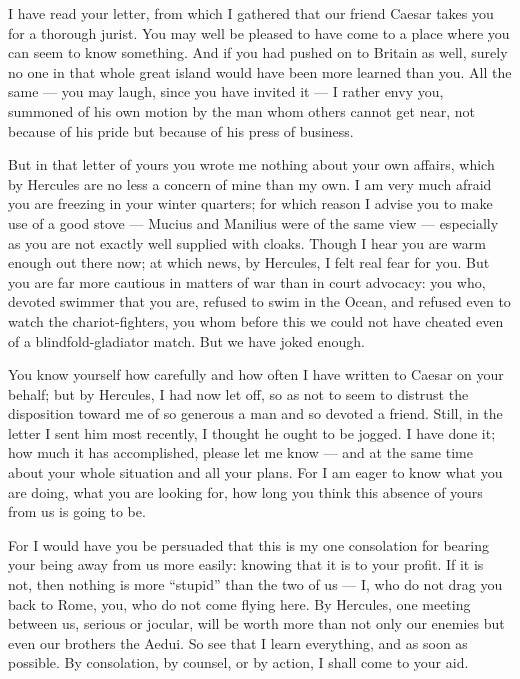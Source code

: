 

 I have read your letter, from which I gathered that our friend Caesar takes you for a thorough jurist. You may well be pleased to have come to a place where you can seem to know something. And if you had pushed on to Britain as well, surely no one in that whole great island would have been more learned than you. All the same --- you may laugh, since you have invited it --- I rather envy you, summoned of his own motion by the man whom others cannot get near, not because of his pride but because of his press of business.

 But in that letter of yours you wrote me nothing about your own affairs, which by Hercules are no less a concern of mine than my own. I am very much afraid you are freezing in your winter quarters; for which reason I advise you to make use of a good stove --- Mucius and Manilius were of the same view --- especially as you are not exactly well supplied with cloaks. Though I hear you are warm enough out there now; at which news, by Hercules, I felt real fear for you. But you are far more cautious in matters of war than in court advocacy: you who, devoted swimmer that you are, refused to swim in the Ocean, and refused even to watch the chariot-fighters, you whom before this we could not have cheated even of a blindfold-gladiator match. But we have joked enough.

 You know yourself how carefully and how often I have written to Caesar on your behalf; but by Hercules, I had now let off, so as not to seem to distrust the disposition toward me of so generous a man and so devoted a friend. Still, in the letter I sent him most recently, I thought he ought to be jogged. I have done it; how much it has accomplished, please let me know --- and at the same time about your whole situation and all your plans. For I am eager to know what you are doing, what you are looking for, how long you think this absence of yours from us is going to be.

 For I would have you be persuaded that this is my one consolation for bearing your being away from us more easily: knowing that it is to your profit. If it is not, then nothing is more ``stupid'' than the two of us --- I, who do not drag you back to Rome, you, who do not come flying here. By Hercules, one meeting between us, serious or jocular, will be worth more than not only our enemies but even our brothers the Aedui. So see that I learn everything, and as soon as possible. By consolation, by counsel, or by action, I shall come to your aid.
